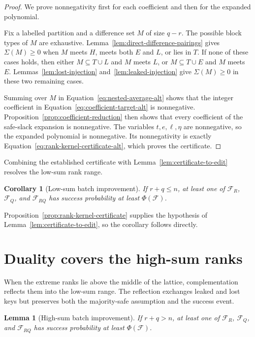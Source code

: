 \documentclass[11pt]{article}
\newtheorem{lemma}[theorem]{Lemma}
\newtheorem{corollary}[theorem]{Corollary}
\newcommand{\cF}{\ensuremath{\mathcal F}\xspace}
\begin{document}
\begin{proof}
We prove nonnegativity first for each coefficient and then for the expanded polynomial.

Fix a labelled partition and a difference set $M$ of size ${q-r}$.
The possible block types of $M$ are exhaustive.
Lemma~\ref{lem:direct-difference-pairings} gives ${\Sigma(M)\geq0}$ when $M$ meets $H$, meets both $E$ and $L$, or lies in $T$.
If none of these cases holds, then either $M\subseteq T\cup L$ and $M$ meets $L$, or $M\subseteq T\cup E$ and $M$ meets $E$.
Lemmas~\ref{lem:lost-injection} and~\ref{lem:leaked-injection} give ${\Sigma(M)\geq0}$ in these two remaining cases.

Summing over $M$ in Equation~\eqref{eq:nested-average-alt} shows that the integer coefficient in Equation~\eqref{eq:coefficient-target-alt} is nonnegative.
Proposition~\ref{prop:coefficient-reduction} then shows that every coefficient of the safe-slack expansion is nonnegative.
The variables $t,e,\ell,\eta$ are nonnegative, so the expanded polynomial is nonnegative.
Its nonnegativity is exactly Equation~\eqref{eq:rank-kernel-certificate-alt}, which proves the certificate.
\end{proof}

Combining the established certificate with Lemma~\ref{lem:certificate-to-edit} resolves the low-sum rank range.

\begin{corollary}[Low-sum batch improvement]\label{cor:low-sum-batch}
If ${r+q\leq n}$, at least one of $\cF_R$, $\cF_Q$, and $\cF_{RQ}$ has success probability at least $\Phi(\cF)$.
\end{corollary}

Proposition~\ref{prop:rank-kernel-certificate} supplies the hypothesis of Lemma~\ref{lem:certificate-to-edit}, so the corollary follows directly.

  \section{Duality covers the high-sum ranks}

When the extreme ranks lie above the middle of the lattice, complementation reflects them into the low-sum range.
The reflection exchanges leaked and lost keys but preserves both the majority-safe assumption and the success event.

\begin{lemma}[High-sum batch improvement]\label{lem:high-sum-batch}
If ${r+q>n}$, at least one of $\cF_R$, $\cF_Q$, and $\cF_{RQ}$ has success probability at least $\Phi(\cF)$.
\end{lemma}
\end{document}
